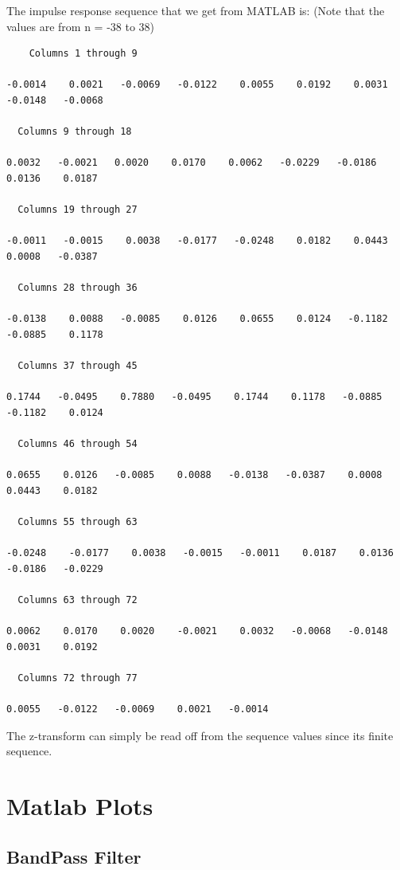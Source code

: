 \documentclass{article}
\begin{document}
The impulse response sequence that we get from MATLAB is: (Note that the values are from n = -38 to 38)

\begin{verbatim}
    Columns 1 through 9

-0.0014    0.0021   -0.0069   -0.0122    0.0055    0.0192    0.0031   -0.0148   -0.0068

  Columns 9 through 18

0.0032   -0.0021   0.0020    0.0170    0.0062   -0.0229   -0.0186    0.0136    0.0187

  Columns 19 through 27

-0.0011   -0.0015    0.0038   -0.0177   -0.0248    0.0182    0.0443    0.0008   -0.0387

  Columns 28 through 36

-0.0138    0.0088   -0.0085    0.0126    0.0655    0.0124   -0.1182   -0.0885    0.1178

  Columns 37 through 45

0.1744   -0.0495    0.7880   -0.0495    0.1744    0.1178   -0.0885   -0.1182    0.0124

  Columns 46 through 54

0.0655    0.0126   -0.0085    0.0088   -0.0138   -0.0387    0.0008    0.0443    0.0182

  Columns 55 through 63

-0.0248    -0.0177    0.0038   -0.0015   -0.0011    0.0187    0.0136   -0.0186   -0.0229

  Columns 63 through 72

0.0062    0.0170    0.0020    -0.0021    0.0032   -0.0068   -0.0148    0.0031    0.0192

  Columns 72 through 77

0.0055   -0.0122   -0.0069    0.0021   -0.0014

\end{verbatim}

\vspace{5mm}

The z-transform can simply be read off from the sequence values since its finite sequence.
\clearpage

\section{Matlab Plots}

\subsection{BandPass Filter}
\end{document}
